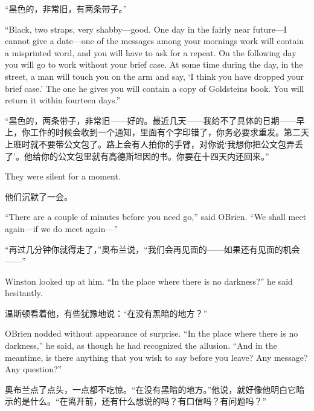 \begin{paracol}{2}
\switchcolumn

``黑色的，非常旧，有两条带子。''

\switchcolumn*

``Black, two straps, very shabby---good. One day in the fairly near
future---I cannot give a date---one of the messages among your
morning\textquotesingle s work will contain a misprinted word, and you
will have to ask for a repeat. On the following day you will go to work
without your brief case. At some time during the day, in the street, a
man will touch you on the arm and say, `I think you have
dropped your brief case.' The one he gives you will
contain a copy of Goldstein\textquotesingle s book. You will return it
within fourteen days.''

\switchcolumn

``黑色的，两条带子，非常旧——好的。最近几天——我给不了具体的日期——早上，你工作的时候会收到一个通知，里面有个字印错了，你务必要求重发。第二天上班时就不要带公文包了。路上会有人拍你的手臂，对你说`我想你把公文包弄丢了'。他给你的公文包里就有高德斯坦因的书。你要在十四天内还回来。''

\switchcolumn*

They were silent for a moment.

\switchcolumn

他们沉默了一会。

\switchcolumn*

``There are a couple of minutes before you need go,'' said
O\textquotesingle Brien. ``We shall meet again---if we do meet again---''

\switchcolumn

``再过几分钟你就得走了，''奥布兰说，``我们会再见面的——如果还有见面的机会——''

\switchcolumn*

Winston looked up at him. ``In the place where there is no darkness?'' he
said hesitantly.

\switchcolumn

温斯顿看着他，有些犹豫地说：``在没有黑暗的地方？''

\switchcolumn*

O\textquotesingle Brien nodded without appearance of surprise. ``In the
place where there is no darkness,'' he said, as though he had recognized
the allusion. ``And in the meantime, is there anything that you wish to
say before you leave? Any message? Any question?''

\switchcolumn

奥布兰点了点头，一点都不吃惊。``在没有黑暗的地方。''他说，就好像他明白它暗示的是什么。``在离开前，还有什么想说的吗？有口信吗？有问题吗？''


\end{paracol}
